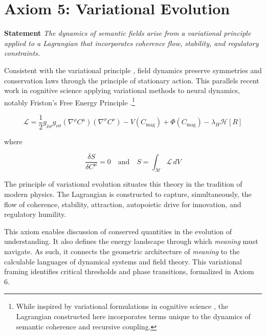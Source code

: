 
\section{Axiom 5: Variational Evolution}
\label{1.5:axiom_5_variational_evolution}

\textbf{Statement} \textit{The dynamics of semantic fields arise from a variational principle applied to a Lagrangian that incorporates coherence flow, stability, and regulatory constraints.}

Consistent with the variational principle \autocite{GoldsteinPooleSafko2002, Arnold1989}, field dynamics preserve symmetries and conservation laws through the principle of stationary action. This parallels recent work in cognitive science applying variational methods to neural dynamics, notably Friston's Free Energy Principle \autocite{Friston2010, Parr2022}.\footnote{While inspired by variational formulations in cognitive science \autocite{Friston2010, Parr2022}, the Lagrangian constructed here incorporates terms unique to the dynamics of semantic coherence and recursive coupling.}

\begin{equation}
\mathcal{L} = \frac{1}{2} g_{\mu\rho} g_{\nu\sigma} (\nabla^\rho C^\mu)(\nabla^\sigma C^\nu) - V(C_{\text{mag}}) + \Phi(C_{\text{mag}}) - \lambda_H \mathcal{H}[R]
\end{equation}

where

\begin{equation}
\frac{\delta S}{\delta C^\mu} = 0 \quad \text{and} \quad S = \int_{\mathcal{M}} \mathcal{L} \, dV
\end{equation}

The principle of variational evolution situates this theory in the tradition of modern physics. The Lagrangian is constructed to capture, simultaneously, the flow of coherence, stability, attraction, autopoietic drive for innovation, and regulatory humility.

This axiom enables discussion of conserved quantities in the evolution of understanding. It also defines the energy landscape through which \textit{meaning} must navigate. As such, it connects the geometric architecture of \textit{meaning} to the calculable languages of dynamical systems and field theory. This variational framing identifies critical thresholds and phase transitions, formalized in Axiom 6.

